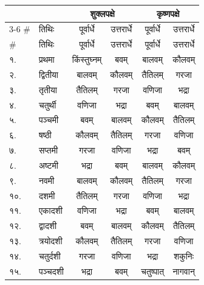 \begin{longtable}{llcccc}
\hline
& & \multicolumn{2}{c}{\textbf{शुक्लपक्षे}} & \multicolumn{2}{c}{\textbf{कृष्णपक्षे}} \\
\cline{3-6}
\# & तिथिः & पूर्वार्धे & उत्तरार्धे & पूर्वार्धे & उत्तरार्धे \\
\hline
\endfirsthead

\hline
\# & तिथिः & पूर्वार्धे & उत्तरार्धे & पूर्वार्धे & उत्तरार्धे \\
\hline
\endhead

 १.  & प्रथमा   & किंस्तुघ्नम्     & बवम्             & बालवम्       & कौलवम्        \\
 २.  & द्वितीया & बालवम्       & कौलवम्         & तैतिलम्       & गरजा         \\
 ३.  & तृतीया   & तैतिलम्       & गरजा            & वणिजा       & भद्रा         \\
 ४.  & चतुर्थी   & वणिजा       & भद्रा            & बवम्         & बालवम्        \\
 ५.  & पञ्चमी   & बवम्         & बालवम्         & कौलवम्       & तैतिलम्        \\
 ६.  & षष्ठी    & कौलवम्       & तैतिलम्          & गरजा        & वणिजा        \\
 ७.  & सप्तमी   & गरजा         & वणिजा         & भद्रा        & बवम्          \\
 ८.  & अष्टमी   & भद्रा         & बवम्           & बालवम्       & कौलवम्        \\
 ९.  & नवमी    & बालवम्       & कौलवम्          & तैतिलम्       & गरजा         \\
 १०. & दशमी    & तैतिलम्       & गरजा           & वणिजा       & भद्रा         \\
 ११. & एकादशी  & वणिजा       & भद्रा         & बवम्         & बालवम्        \\
 १२. & द्वादशी  & बवम्         & बालवम्        & कौलवम्       & तैतिलम्        \\
 १३. & त्रयोदशी & कौलवम्       & तैतिलम्        & गरजा        & वणिजा        \\
 १४. & चतुर्दशी  & गरजा         & वणिजा        & भद्रा        & शकुनिः        \\
 १५. & पञ्चदशी  & भद्रा         & बवम्           & चतुष्पात्     & नागवान्       \\
\hline
\end{longtable}